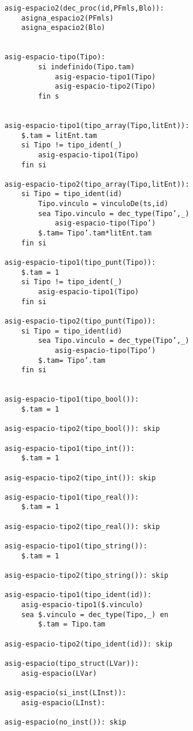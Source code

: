 \begin{lstlisting}
    asig-espacio2(dec_proc(id,PFmls,Blo)):
        asigna_espacio2(PFmls)
        asigna_espacio2(Blo) 
    
        
    asig-espacio-tipo(Tipo):
            si indefinido(Tipo.tam) 
                asig-espacio-tipo1(Tipo) 
                asig-espacio-tipo2(Tipo)
            fin s

            
    asig-espacio-tipo1(tipo_array(Tipo,litEnt)):
        $.tam = litEnt.tam
        si Tipo != tipo_ident(_)
            asig-espacio-tipo1(Tipo)
        fin si

    asig-espacio-tipo2(tipo_array(Tipo,litEnt)):
        si Tipo = tipo_ident(id)
            Tipo.vinculo = vinculoDe(ts,id)
            sea Tipo.vinculo = dec_type(Tipo’,_)
                asig-espacio-tipo(Tipo’) 
            $.tam= Tipo’.tam*litEnt.tam
        fin si 

    asig-espacio-tipo1(tipo_punt(Tipo)):
        $.tam = 1
        si Tipo != tipo_ident(_)
            asig-espacio-tipo1(Tipo)
        fin si

    asig-espacio-tipo2(tipo_punt(Tipo)):
        si Tipo = tipo_ident(id)
            sea Tipo.vinculo = dec_type(Tipo’,_)
                asig-espacio-tipo(Tipo’) 
            $.tam= Tipo’.tam
        fin si 
 

    asig-espacio-tipo1(tipo_bool()): 
        $.tam = 1

    asig-espacio-tipo2(tipo_bool()): skip

    asig-espacio-tipo1(tipo_int()): 
        $.tam = 1

    asig-espacio-tipo2(tipo_int()): skip

    asig-espacio-tipo1(tipo_real()): 
        $.tam = 1

    asig-espacio-tipo2(tipo_real()): skip

    asig-espacio-tipo1(tipo_string()): 
        $.tam = 1

    asig-espacio-tipo2(tipo_string()): skip

    asig-espacio-tipo1(tipo_ident(id)):
        asig-espacio-tipo1($.vinculo)
        sea $.vinculo = dec_type(Tipo,_) en
            $.tam = Tipo.tam

    asig-espacio-tipo2(tipo_ident(id)): skip

    asig-espacio(tipo_struct(LVar)):
        asig-espacio(LVar)

    asig-espacio(si_inst(LInst)):
        asig-espacio(LInst):

    asig-espacio(no_inst()): skip


\end{lstlisting}
